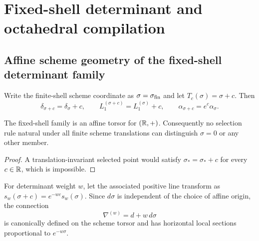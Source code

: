 \documentclass[12pt,a4paper]{article}
\begin{document}
\section{Fixed-shell determinant and octahedral compilation}
\label{paper3c:sec:organized-determinant}
\subsection{Affine scheme geometry of the fixed-shell determinant family}
\label{p3c:sec:reg-affine-scheme-update}

Write the finite-shell scheme coordinate as $\sigma=\sigma_{\rm fin}$ and
let $T_c(\sigma)=\sigma+c$.  Then
\[
 \delta_{\sigma+c}=\delta_\sigma+c,
 \qquad
 L_1^{(\sigma+c)}=L_1^{(\sigma)}+c,
 \qquad
 \alpha_{\sigma+c}=e^c\alpha_\sigma.
\]

\begin{proposition}
\label{p3c:prop:no-natural-reg-origin}
The fixed-shell family is an affine torsor for $(\mathbb{R},+)$.  Consequently no
selection rule natural under all finite scheme translations can distinguish
$\sigma=0$ or any other member.
\end{proposition}

\begin{proof}
A translation-invariant selected point would satisfy $\sigma_*=\sigma_*+c$
for every $c\in\mathbb{R}$, which is impossible.
\end{proof}

For determinant weight $w$, let the associated positive line transform as
$s_w(\sigma+c)=e^{-wc}s_w(\sigma)$.  Since $d\sigma$ is independent of the
choice of affine origin, the connection
\begin{equation}
 \label{p3c:eq:scheme-weight-connection}
 \nabla^{(w)}=d+w\,d\sigma
\end{equation}
is canonically defined on the scheme torsor and has horizontal local sections
proportional to $e^{-w\sigma}$.
\end{document}
